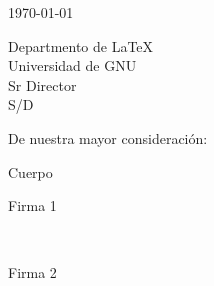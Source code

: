 \documentclass[a4paper,12pt]{article}
\begin{document}
\begin{flushright}
\today
\end{flushright}

\noindent
Departmento de \LaTeX \\
Universidad de GNU \\
Sr Director \\
S/D
\vspace{1em}

\noindent De nuestra mayor consideración:

Cuerpo

\vspace{4em}

\begin{minipage}{0.5\linewidth}
    \begin{center}
    Firma 1
    \end{center}
\end{minipage}
~
\begin{minipage}{0.5\linewidth}
    \begin{center}
    Firma 2
    \end{center}
\end{minipage}
\end{document}
